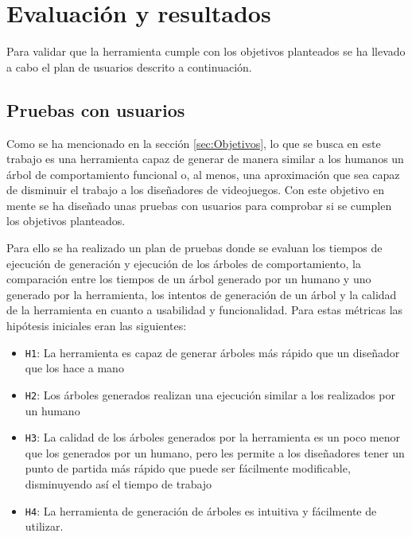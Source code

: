 \chapter{Evaluación y resultados}
\label{sec:Usuarios}

Para validar que la herramienta cumple con los objetivos planteados se ha llevado a cabo el plan de usuarios descrito a continuación.

\section{Pruebas con usuarios}
\label{sec:Pruebas}
Como se ha mencionado en la sección \ref{sec:Objetivos}, lo que se busca en este trabajo es una herramienta capaz de generar de manera similar a los humanos un árbol de comportamiento funcional o, al menos, una aproximación que sea capaz de disminuir el trabajo a los diseñadores de videojuegos.
Con este objetivo en mente se ha diseñado unas pruebas con usuarios para comprobar si se cumplen los objetivos planteados.

Para ello se ha realizado un plan de pruebas donde se evaluan los tiempos de ejecución de generación y ejecución de los árboles de comportamiento, la comparación entre los tiempos de un árbol generado por un humano y uno generado por la herramienta, los intentos de generación de un árbol y la calidad de la herramienta en cuanto a usabilidad y funcionalidad.
Para estas métricas las hipótesis iniciales eran las siguientes:
\begin{itemize}
    \item \texttt{H1}: La herramienta es capaz de generar árboles más rápido que un diseñador que los hace a mano
    \item \texttt{H2}: Los árboles generados realizan una ejecución similar a los realizados por un humano
    \item \texttt{H3}: La calidad de los árboles generados por la herramienta es un poco menor que los generados por un humano, pero les permite a los diseñadores tener un punto de partida más rápido que puede ser fácilmente modificable, disminuyendo así el tiempo de trabajo
    \item \texttt{H4}: La herramienta de generación de árboles es intuitiva y fácilmente de utilizar.
\end{itemize}


